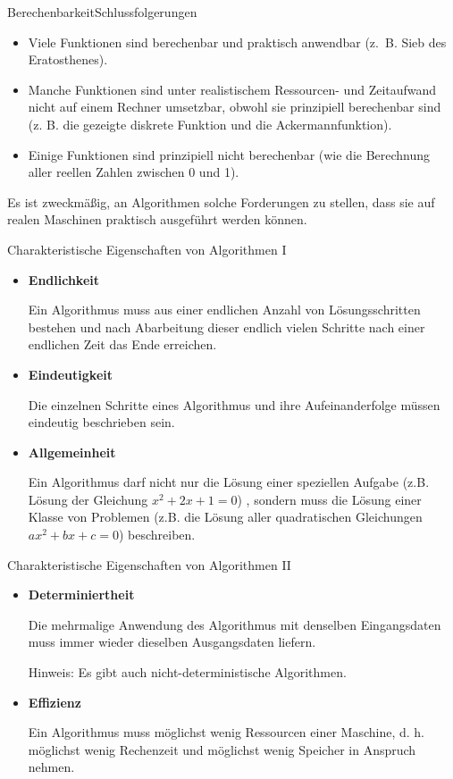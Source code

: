 \documentclass[xelatex,aspectratio=169]{beamer}
\begin{document}
\begin{frame}{Berechenbarkeit}{Schlussfolgerungen}
  \begin{itemize}
    \item Viele Funktionen sind berechenbar und praktisch anwendbar (z.~B. Sieb des Eratosthenes).
    \item Manche Funktionen sind unter realistischem Ressourcen- und Zeitaufwand nicht auf einem Rechner umsetzbar, obwohl sie prinzipiell berechenbar sind (z. B. die gezeigte diskrete Funktion und die Ackermannfunktion).
    \item Einige Funktionen sind prinzipiell nicht berechenbar (wie die Berechnung aller reellen Zahlen zwischen 0 und 1).
  \end{itemize}
  \Rightarrow Es ist zweckmäßig, an Algorithmen solche Forderungen zu stellen, dass sie auf realen Maschinen praktisch ausgeführt werden können.

\end{frame}

\begin{frame}{Charakteristische Eigenschaften von Algorithmen I}
  \begin{itemize}
    \item \textbf{Endlichkeit}

          Ein Algorithmus muss aus einer endlichen Anzahl von Lösungsschritten bestehen und nach Abarbeitung dieser endlich vielen Schritte nach einer endlichen Zeit das Ende erreichen.

    \item \textbf{Eindeutigkeit}

          Die einzelnen Schritte eines Algorithmus und ihre Aufeinanderfolge müssen eindeutig beschrieben sein.
    \item \textbf{Allgemeinheit}

          Ein Algorithmus darf nicht nur die Lösung einer speziellen Aufgabe (z.B. Lösung der Gleichung $x^2 + 2x + 1=0$) , sondern muss die Lösung einer Klasse von Problemen (z.B. die Lösung aller quadratischen Gleichungen $ax^2 + bx + c = 0$) beschreiben.
  \end{itemize}
\end{frame}

\begin{frame}{Charakteristische Eigenschaften von Algorithmen II}
  \begin{itemize}
    \item \textbf{Determiniertheit}

          Die mehrmalige Anwendung des Algorithmus mit denselben Eingangsdaten muss immer wieder dieselben Ausgangsdaten liefern.

          Hinweis: Es gibt auch nicht-deterministische Algorithmen.
    \item \textbf{Effizienz}

          Ein Algorithmus muss möglichst wenig Ressourcen einer Maschine, d. h. möglichst wenig Rechenzeit und möglichst wenig Speicher in Anspruch nehmen.
  \end{itemize}
\end{frame}
\end{document}
